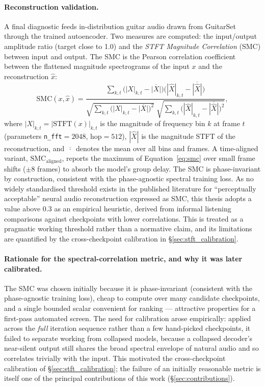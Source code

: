 \documentclass[a4paper,11pt,oneside,openany]{book}
\begin{document}
\paragraph{Reconstruction validation.} A final diagnostic feeds in-distribution guitar audio drawn from GuitarSet through the trained autoencoder. Two measures are computed: the input/output amplitude ratio (target close to 1.0) and the \emph{STFT Magnitude Correlation} (SMC) between input and output. The SMC is the Pearson correlation coefficient between the flattened magnitude spectrograms of the input $x$ and the reconstruction $\hat{x}$:
\begin{equation}
\mathrm{SMC}(x,\hat{x}) =
\frac{\displaystyle\sum_{k,t}\big(|X|_{k,t}-\overline{|X|}\big)\big(|\hat{X}|_{k,t}-\overline{|\hat{X}|}\big)}
{\sqrt{\displaystyle\sum_{k,t}\big(|X|_{k,t}-\overline{|X|}\big)^{2}}\;\sqrt{\displaystyle\sum_{k,t}\big(|\hat{X}|_{k,t}-\overline{|\hat{X}|}\big)^{2}}},
\label{eq:smc}
\end{equation}
where $|X|_{k,t}=|\mathrm{STFT}(x)|_{k,t}$ is the magnitude of frequency bin $k$ at frame $t$ (parameters \texttt{n\_fft}$=2048$, hop$=512$), $|\hat{X}|$ is the magnitude STFT of the reconstruction, and $\overline{\,\cdot\,}$ denotes the mean over all bins and frames. A time-aligned variant, $\mathrm{SMC}_{\text{aligned}}$, reports the maximum of Equation~\eqref{eq:smc} over small frame shifts ($\pm 8$ frames) to absorb the model's group delay. The SMC is phase-invariant by construction, consistent with the phase-agnostic spectral training loss. As no widely standardised threshold exists in the published literature for ``perceptually acceptable'' neural audio reconstruction expressed as SMC, this thesis adopts a value above 0.3 as an empirical heuristic, derived from informal listening comparisons against checkpoints with lower correlations. This is treated as a pragmatic working threshold rather than a normative claim, and its limitations are quantified by the cross-checkpoint calibration in \S\ref{sec:stft_calibration}.

\paragraph{Rationale for the spectral-correlation metric, and why it was later calibrated.} The SMC was chosen initially because it is phase-invariant (consistent with the phase-agnostic training loss), cheap to compute over many candidate checkpoints, and a single bounded scalar convenient for ranking --- attractive properties for a first-pass automated screen. The need for calibration arose empirically: applied across the \emph{full} iteration sequence rather than a few hand-picked checkpoints, it failed to separate working from collapsed models, because a collapsed decoder's near-silent output still shares the broad spectral envelope of natural audio and so correlates trivially with the input. This motivated the cross-checkpoint calibration of \S\ref{sec:stft_calibration}; the failure of an initially reasonable metric is itself one of the principal contributions of this work (\S\ref{sec:contributions}).
\end{document}
